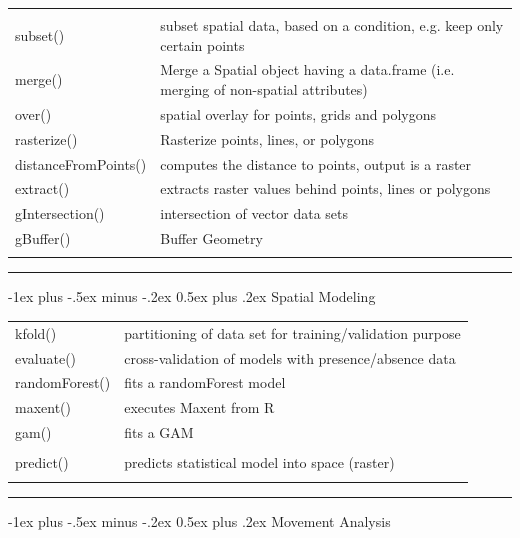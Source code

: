 \documentclass[10pt,landscape]{article}
\makeatletter
\renewcommand{\section}{\@startsection{section}{1}{0mm}%
                                {-1ex plus -.5ex minus -.2ex}%
                                {0.5ex plus .2ex}%
                                {\normalfont\large\bfseries}}
\makeatother
\begin{document}
\begin{multicols}{3}
\begin{tabular}{@{}p{\the\MyLen}%
                @{}p{\linewidth-\the\MyLen}@{}}
                & \\
subset()		& subset spatial data, based on a condition, e.g. keep only certain points \\                
merge() 		& Merge a Spatial object having a data.frame (i.e. merging of non-spatial attributes)\\
over()			& spatial overlay for points, grids and polygons \\
rasterize() 		& Rasterize points, lines, or polygons\\ 
distanceFromPoints()    & computes the distance to points, output is a raster\\
extract()		& extracts raster values behind points, lines or polygons \\
gIntersection()		& intersection of vector data sets \\
gBuffer()		& Buffer Geometry \\
 & 
\end{tabular}


\rule{0.32\textwidth}{0.4pt}



\section{Spatial Modeling}

\begin{tabular}{@{}p{\the\MyLen}%
                @{}p{\linewidth-\the\MyLen}@{}}
kfold() & partitioning of data set for training/validation purpose\\
evaluate() & cross-validation of models with presence/absence data\\               
randomForest() & fits a randomForest model  \\
maxent() & executes Maxent from R\\
gam() & fits a GAM \\
 &  \\                
predict() & predicts statistical model into space (raster) \\

 & 

\end{tabular}


\rule{0.32\textwidth}{0.4pt}
\scriptsize


\section{Movement Analysis}


\end{multicols}
\end{document}
